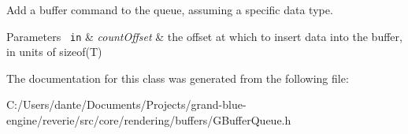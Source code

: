 Add a buffer command to the queue, assuming a specific data type. 


\begin{DoxyParams}[1]{Parameters}
\mbox{\texttt{ in}}  & {\em count\+Offset} & the offset at which to insert data into the buffer, in units of sizeof(\+T) \\
\hline
\end{DoxyParams}


The documentation for this class was generated from the following file\+:\begin{DoxyCompactItemize}
\item 
C\+:/\+Users/dante/\+Documents/\+Projects/grand-\/blue-\/engine/reverie/src/core/rendering/buffers/G\+Buffer\+Queue.\+h\end{DoxyCompactItemize}
